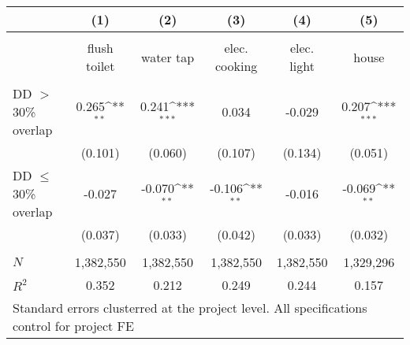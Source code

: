 {
\def\sym#1{\ifmmode^{#1}\else\(^{#1}\)\fi}
\begin{tabular}{l*{5}{c}}
 & (1) & (2) & (3) & (4) & (5)  \\[0.2em]
\hline\\[-0.9em]

                           &   flush toilet   &   water tap     &   elec. cooking  &   elec. light &  house\\
[0.2em]\hline \\[-0.9em]

DD $>$30\% overlap         &    0.265\sym{**} &  0.241\sym{***} &    0.034         &   -0.029      &    0.207\sym{***}\\
                           &  (0.101)         &  (0.060)        &  (0.107)         &  (0.134)      &  (0.051)         \\
[0.5em]
DD $\leq$30\% overlap      &   -0.027         & -0.070\sym{**}  &   -0.106\sym{**} &   -0.016      &   -0.069\sym{**} \\
                           &  (0.037)         &  (0.033)        &  (0.042)         &  (0.033)      &  (0.032)         \\
\hline \\[-0.9em]    
\(N\)                      &  1,382,550       &  1,382,550      &  1,382,550       &  1,382,550    &  1,329,296         \\
\(R^{2}\)                  &    0.352         &    0.212        &    0.249         &    0.244      &    0.157         \\\hline
\multicolumn{6}{l}{\tiny Standard errors clusterred at the project level. All specifications control for project FE}
\end{tabular}
}

